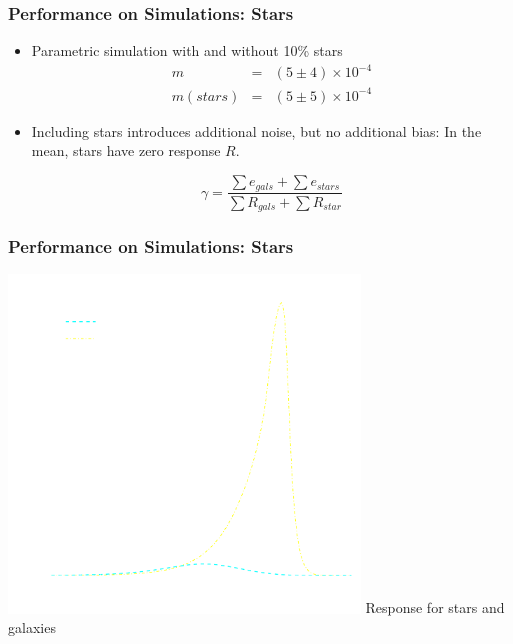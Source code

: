 \documentclass{beamer}
\begin{document}
\frame
{
    \frametitle{Performance on Simulations: Stars}

 
    \begin{itemize}

        \item Parametric simulation with and without {\color{gold} 10\% stars}
             {\color{lightskyblue} 
                 \begin{eqnarray}
                     m        & = & (5 \pm 4) \times 10^{-4} \nonumber \\
                     m(stars) & = & (5 \pm 5) \times 10^{-4} \nonumber
                 \end{eqnarray}
             }

         \item Including stars introduces additional noise, but no
             additional bias: In the mean, stars have zero response {\color{gold} $R$}.

             {\color{mygray} 
                 \begin{equation}
                     \gamma = \frac{\sum e_{gals} + \sum e_{stars}}{\sum R_{gals} + \sum R_{star}} \nonumber
                 \end{equation}
             }


    \end{itemize}

}

\frame
{
    \frametitle{Performance on Simulations: Stars}
 
    \begin{center}
        \includegraphics[width=0.7\textwidth]{R-dt-with-stars-icolor.pdf}
        \newline
        {\large Response for stars and galaxies}
    \end{center}

}
\end{document}
